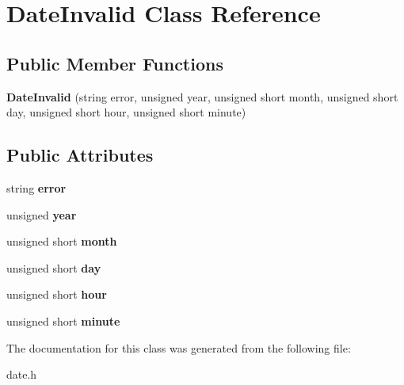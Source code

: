 \hypertarget{class_date_invalid}{}\section{Date\+Invalid Class Reference}
\label{class_date_invalid}
\subsection*{Public Member Functions}
\begin{DoxyCompactItemize}
\item 
\mbox{\label{class_date_invalid_a093a6b35b071ccd1cb368e8a161cda86}} 
{\bfseries Date\+Invalid} (string error, unsigned year, unsigned short month, unsigned short day, unsigned short hour, unsigned short minute)
\end{DoxyCompactItemize}
\subsection*{Public Attributes}
\begin{DoxyCompactItemize}
\item 
\mbox{\label{class_date_invalid_a7482d7083006e3a1d362e5f0ec8fb70d}} 
string {\bfseries error}
\item 
\mbox{\label{class_date_invalid_a29e121f80a3a32e2698f21b3d8be2d40}} 
unsigned {\bfseries year}
\item 
\mbox{\label{class_date_invalid_a670452917cff3a57732593b2cb446485}} 
unsigned short {\bfseries month}
\item 
\mbox{\label{class_date_invalid_a0ff9d8bbf402f843909923816f28750a}} 
unsigned short {\bfseries day}
\item 
\mbox{\label{class_date_invalid_a902d2eb37863da18e27f6740258f224e}} 
unsigned short {\bfseries hour}
\item 
\mbox{\label{class_date_invalid_a9b2d1816919fd9cf22a02b7cd12bbb06}} 
unsigned short {\bfseries minute}
\end{DoxyCompactItemize}


The documentation for this class was generated from the following file\+:\begin{DoxyCompactItemize}
\item 
date.\+h\end{DoxyCompactItemize}
